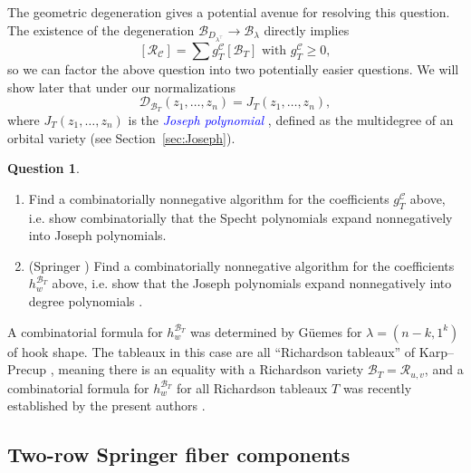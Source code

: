 \documentclass[11pt]{amsart}
\theoremstyle{definition}
\newtheorem{question}[thm]{Question}
\numberwithin{equation}{section}
\renewcommand\emph[1]{\textcolor{blue}{\textit{#1}}} %
\begin{document}
The geometric degeneration gives a potential avenue for resolving this question.
The existence of the degeneration $\mathcal{B}_{D_{\lambda^{\top}}}\to \mathcal{B}_\lambda$ directly implies
$$[\mathcal{R}_{\mathcal{C}}]=\sum g^{\mathcal{C}}_T [\mathcal{B}_T]\text{ with }g^{\mathcal{C}}_T\ge 0,$$
so we can factor the above question into two potentially easier questions.
We will show later that under our normalizations  $$\mathcal{D}_{\mathcal{B}_T}(z_1,\ldots,z_n)=J_T(z_1,\ldots,z_n),$$ where $J_T(z_1,\dots,z_n)$ is the \emph{Joseph polynomial}  \cite{Jo84,Jo89,KZJ14, RTVZJ12}, defined as the multidegree of an orbital variety (see Section~\ref{sec:Joseph}).
\begin{question}
\label{question:PositiveExpansions}\leavevmode
\begin{enumerate}
    \item\label{it:RtoB} Find a combinatorially nonnegative algorithm for the coefficients $g^{\mathcal{C}}_T$ above, i.e. show combinatorially that the Specht polynomials expand nonnegatively into Joseph polynomials.
    \item\label{it:SpringerQuestion} (Springer \cite{springerconj}) Find a combinatorially nonnegative algorithm for the coefficients $h_w^{\mathcal{B}_T}$ above, i.e. show that the Joseph polynomials expand nonnegatively into degree polynomials .
\end{enumerate}
\end{question}

A combinatorial formula for $h^{\mathcal{B}_T}_w$ was determined by G\"uemes \cite{Gu89} for $\lambda=(n-k,1^k)$ of hook shape. The tableaux in this case are all ``Richardson tableaux'' of Karp--Precup \cite{karp2025richardsontableauxcomponentsspringer}, meaning there is an equality with a Richardson variety $\mathcal{B}_T=\mathcal{R}_{u,v}$, and a combinatorial formula for $h^{\mathcal{B}_T}_w$ for all Richardson tableaux $T$ was recently established by the present authors \cite{spink2025richardsontableauxschubertpositivity}.

\subsection{Two-row Springer fiber components}
\end{document}
